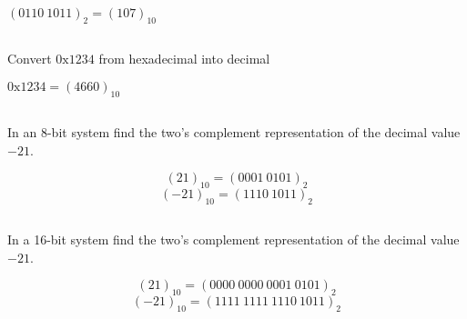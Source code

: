 \documentclass[paper=a4, fontsize=11pt]{scrartcl} %
\begin{document}
${(0110\ 1011)}_2 = {(107)}_{10}$

\subsection{}
\begin{fancyquotes}
  Convert $\mathrm{0x1234}$ from hexadecimal into decimal
\end{fancyquotes}

$\mathrm{0x1234} = {(4660)}_{10}$

\subsection{}
\begin{fancyquotes}
  In an 8-bit system find the two's complement representation of the
  decimal value $-21$.
\end{fancyquotes}

$${(21)}_{10}  = {(0001\ 0101)}_2$$
$${(-21)}_{10} = {(1110\ 1011)}_2$$

\subsection{}
\begin{fancyquotes}
  In a 16-bit system find the two's complement representation of the
  decimal value $-21$.
\end{fancyquotes}

$${(21)}_{10}  = {(0000\ 0000\ 0001\ 0101)}_2$$
$${(-21)}_{10} = {(1111\ 1111\ 1110\ 1011)}_2$$
\end{document}
